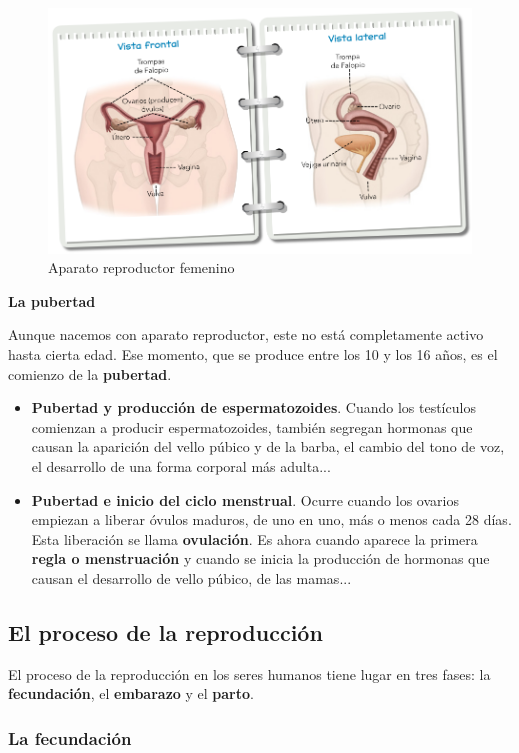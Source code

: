 \begin{figure}[!ht]
    \centering
    \includegraphics[width=0.7\linewidth]{Tema3/16_Aparato_reproductor_femenino.png}
    \caption{Aparato reproductor femenino}
    \label{fig:reproductor-femenino}
\end{figure}

\textbf{La pubertad}

\vspace{3mm}
Aunque nacemos con aparato reproductor, este no está completamente activo hasta cierta edad. Ese momento, que se produce entre los 10 y los 16 años, es el comienzo de la \textbf{pubertad}.

\begin{itemize}
    \item \textbf{Pubertad y producción de espermatozoides}. Cuando los testículos comienzan a producir espermatozoides, también segregan hormonas que causan la aparición del vello púbico y de la barba, el cambio del tono de voz, el desarrollo de una forma corporal más adulta...
    \item \textbf{Pubertad e inicio del ciclo menstrual}. Ocurre cuando los ovarios empiezan a liberar óvulos maduros, de uno en uno, más o menos cada 28 días. Esta liberación se llama \textbf{ovulación}. Es ahora cuando aparece la primera \textbf{regla o menstruación} y cuando se inicia la producción de hormonas que causan el desarrollo de vello púbico, de las mamas...
\end{itemize}

\subsection{El proceso de la reproducción}

El proceso de la reproducción en los seres humanos tiene lugar en tres fases: la \textbf{fecundación}, el \textbf{embarazo} y el \textbf{parto}.

\subsubsection{La fecundación}

